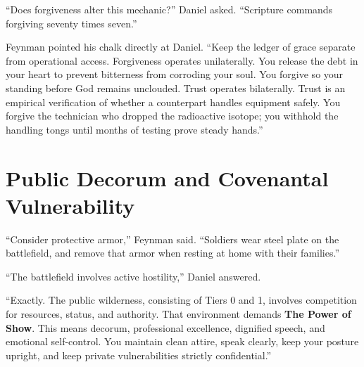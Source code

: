 \documentclass[11pt]{report}
\begin{document}
``Does forgiveness alter this mechanic?'' Daniel asked. ``Scripture commands forgiving seventy times seven.''

Feynman pointed his chalk directly at Daniel. ``Keep the ledger of grace separate from operational access. Forgiveness operates unilaterally. You release the debt in your heart to prevent bitterness from corroding your soul. You forgive so your standing before God remains unclouded. Trust operates bilaterally. Trust is an empirical verification of whether a counterpart handles equipment safely. You forgive the technician who dropped the radioactive isotope; you withhold the handling tongs until months of testing prove steady hands.''

\chapter{Public Decorum and Covenantal Vulnerability}

``Consider protective armor,'' Feynman said. ``Soldiers wear steel plate on the battlefield, and remove that armor when resting at home with their families.''

``The battlefield involves active hostility,'' Daniel answered.

``Exactly. The public wilderness, consisting of Tiers 0 and 1, involves competition for resources, status, and authority. That environment demands \textbf{The Power of Show}. This means decorum, professional excellence, dignified speech, and emotional self-control. You maintain clean attire, speak clearly, keep your posture upright, and keep private vulnerabilities strictly confidential.''
\end{document}
